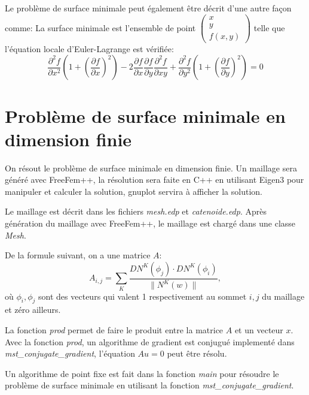 \documentclass[a4paper, 11pt]{article}
\begin{document}
\newpage

Le probl\`eme de surface minimale peut \'egalement \^etre d\'ecrit d'une autre
 fa\c{c}on comme:
La surface minimale est l'ensemble de point
 $\begin{pmatrix}x \\ y \\ f(x, y)\end{pmatrix}$ telle que l'\'equation locale
 d'Euler-Lagrange est v\'erifi\'ee: \\
\begin{equation}
\frac{\partial^2f}{\partial x^2}\left(1+\left(\frac{\partial f}{\partial x}\right)^2\right)-2\frac{\partial f}{\partial x}\frac{\partial f}{\partial y}\frac{\partial^2f}{\partial xy}+\frac{\partial^2f}{\partial y^2}\left(1+\left(\frac{\partial f}{\partial y}\right)^2\right) = 0
\end{equation}

\newpage

\section{Probl\`eme de surface minimale en dimension finie}
On r\'esout le probl\`eme de surface minimale en dimension finie. Un maillage
 sera g\'en\'er\'e avec FreeFem++, la r\'esolution sera faite en C++ en
 utilisant Eigen3 pour manipuler et calculer la solution, gnuplot servira \`a
 afficher la solution.

Le maillage est d\'ecrit dans les fichiers \textit{mesh.edp} et
 \textit{catenoide.edp}. Apr\`es g\'en\'eration du maillage avec FreeFem++,
 le maillage est charg\'e dans une classe \textit{Mesh}.

De la formule suivant, on a une matrice $A$:
$$
A_{i,j}=\sum\limits_{K}\frac{DN^K(\phi_j)\cdot DN^K(\phi_i)}{\|N^K(w)\|},
$$
 o\`u $\phi_i, \phi_j$ sont des vecteurs qui valent 1 respectivement au sommet
 $i,j$ du maillage et z\'ero ailleurs.

La fonction \textit{prod} permet de faire le produit entre la matrice $A$ et un
 vecteur $x$. Avec la fonction \textit{prod}, un algorithme de gradient
 est conjugu\'e implement\'e dans \textit{mst\_conjugate\_gradient},
 l'\'equation $Au=0$ peut \^etre r\'esolu.

Un algorithme de point fixe est fait
 dans la fonction \textit{main} pour r\'esoudre le probl\`eme de surface
 minimale en utilisant la fonction \textit{mst\_conjugate\_gradient}.

\newpage
\end{document}
